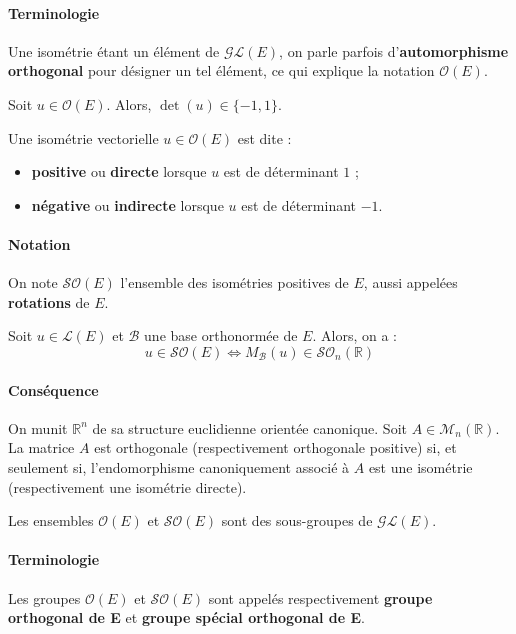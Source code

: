 \documentclass[french]{article}
\newcommand{\R}{\mathbb{R}}
\theoremstyle{plain}
\theoremstyle{definition}
\theoremstyle{remark}
\begin{document}
\paragraph{Terminologie} Une isométrie étant un élément de $\mathcal{GL}(E)$, on parle parfois d'\textbf{automorphisme orthogonal} pour désigner un tel élément, ce qui explique la notation $\mathcal{O}(E)$.

\begin{thm}{}
	Soit $u\in\mathcal{O}(E)$. Alors, $\det(u)\in\{-1,1\}$.
\end{thm}

\begin{dfn}
	Une isométrie vectorielle $u\in\mathcal{O}(E)$ est dite :
	\begin{itemize}
		\item \textbf{positive} ou \textbf{directe} lorsque $u$ est de déterminant $1$ ;
		\item \textbf{négative} ou \textbf{indirecte} lorsque $u$ est de déterminant $-1$.
	\end{itemize}
\end{dfn}

\paragraph{Notation} On note $\mathcal{SO}(E)$ l'ensemble des isométries positives de $E$, aussi appelées \textbf{rotations} de $E$.

\begin{thm}{}
	Soit $u\in\mathcal{L}(E)$ et $\mathcal{B}$ une base orthonormée de $E$. Alors, on a : $$u\in\mathcal{SO}(E)\iff M_\mathcal{B}(u)\in\mathcal{SO}_n(\R)$$
\end{thm}

\paragraph{Conséquence} On munit $\R^n$ de sa structure euclidienne orientée canonique. Soit $A\in\mathcal{M}_n(\R)$. La matrice $A$ est orthogonale (respectivement orthogonale positive) si, et seulement si, l'endomorphisme canoniquement associé à $A$ est une isométrie (respectivement une isométrie directe).

\begin{thm}{}
	Les ensembles $\mathcal{O}(E)$ et $\mathcal{SO}(E)$ sont des sous-groupes de $\mathcal{GL}(E)$.
\end{thm}

\paragraph{Terminologie} Les groupes $\mathcal{O}(E)$ et $\mathcal{SO}(E)$ sont appelés respectivement \textbf{groupe orthogonal de E} et \textbf{groupe spécial orthogonal de E}.
\end{document}
